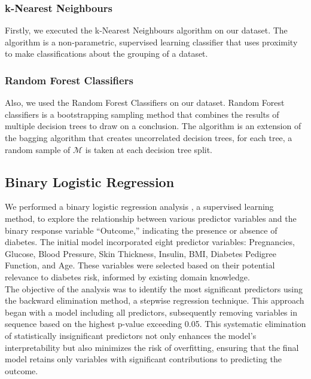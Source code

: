 \documentclass[12pt]{article}
\begin{document}
 \subsubsection{k-Nearest Neighbours}

 Firstly, we executed the k-Nearest Neighbours algorithm \cite{peterson2009k} on our dataset. The algorithm is a non-parametric, supervised learning classifier that uses proximity to make classifications about the grouping of a dataset.

 \subsubsection{Random Forest Classifiers}
 
 Also, we used the Random Forest Classifiers \cite{zhou2012ensemble} on our dataset. Random Forest classifiers is a bootstrapping sampling method that combines the results of multiple decision trees to draw on a conclusion. The algorithm \cite{Lecture16} is an extension of the bagging algorithm \cite{Lecture16} that creates uncorrelated decision trees, for each tree, a random sample of $\mathcal{M}$ is taken at each decision tree split.

\subsection{Binary Logistic Regression}
We performed a binary logistic regression analysis \cite{faraway2016extending}, a supervised learning method, to explore the relationship between various predictor variables and the binary response variable “Outcome,” indicating the presence or absence of diabetes. The initial model incorporated eight predictor variables: Pregnancies, Glucose, Blood Pressure, Skin Thickness, Insulin, BMI, Diabetes Pedigree Function, and Age. These variables were selected based on their potential relevance to diabetes risk, informed by existing domain knowledge.\\
\setlength{\parindent}{0pt}
The objective of the analysis was to identify the most significant predictors using the backward elimination method, a stepwise regression technique. This approach began with a model including all predictors, subsequently removing variables in sequence based on the highest p-value exceeding 0.05. This systematic elimination of statistically insignificant predictors not only enhances the model’s interpretability but also minimizes the risk of overfitting, ensuring that the final model retains only variables with significant contributions to predicting the outcome.
\end{document}
